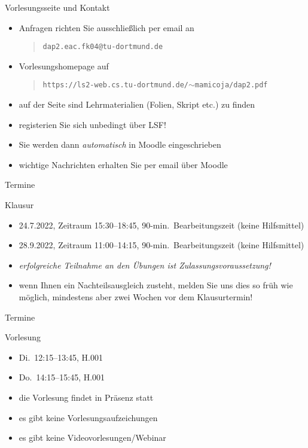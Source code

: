 \documentclass[aspectratio=1610, 11pt]{beamer}
\begin{document}
\begin{frame}{Vorlesungsseite und Kontakt}
	\begin{exampleblock}{}
		\begin{itemize}
			\item Anfragen richten Sie ausschlie\ss lich per email an
				\begin{quote}
\tt dap2.eac.fk04@tu-dortmund.de
				\end{quote}
			\item Vorlesungshomepage auf
				\begin{quote}
\tt https://ls2-web.cs.tu-dortmund.de/$\sim$mamicoja/dap2.pdf
				\end{quote}
			\item auf der Seite sind Lehrmaterialien (Folien, Skript etc.) zu finden
			\item registerien Sie sich \alert{unbedingt} \"uber LSF!
			\item Sie werden dann \emph{automatisch} in \alert{Moodle} eingeschrieben
			\item wichtige Nachrichten erhalten Sie per email \"uber Moodle
		\end{itemize}
	\end{exampleblock}
\end{frame}


\begin{frame}{Termine}
	\begin{exampleblock}{Klausur}
		\begin{itemize}
			\item 24.7.2022, Zeitraum 15:30--18:45, 90-min.\ Bearbeitungszeit (keine Hilfsmittel)
			\item 28.9.2022, Zeitraum 11:00--14:15, 90-min.\ Bearbeitungszeit (keine Hilfsmittel)
			\item \emph{erfolgreiche Teilnahme an den \"Ubungen ist Zulassungsvoraussetzung!}
			\item wenn Ihnen ein Nachteilsausgleich zusteht, melden Sie uns dies so fr\"uh wie m\"oglich, mindestens aber zwei Wochen vor dem Klausurtermin!
		\end{itemize}
	\end{exampleblock}
\end{frame}

\begin{frame}{Termine}
	\begin{exampleblock}{Vorlesung}
		\begin{itemize}
			\item Di.\ 12:15--13:45, H.001
			\item Do.\ 14:15--15:45, H.001
			\item die Vorlesung findet in Pr\"asenz statt
			\item es gibt keine Vorlesungsaufzeichungen
			\item es gibt keine Videovorlesungen/Webinar
		\end{itemize}
	\end{exampleblock}
\end{frame}
\end{document}

